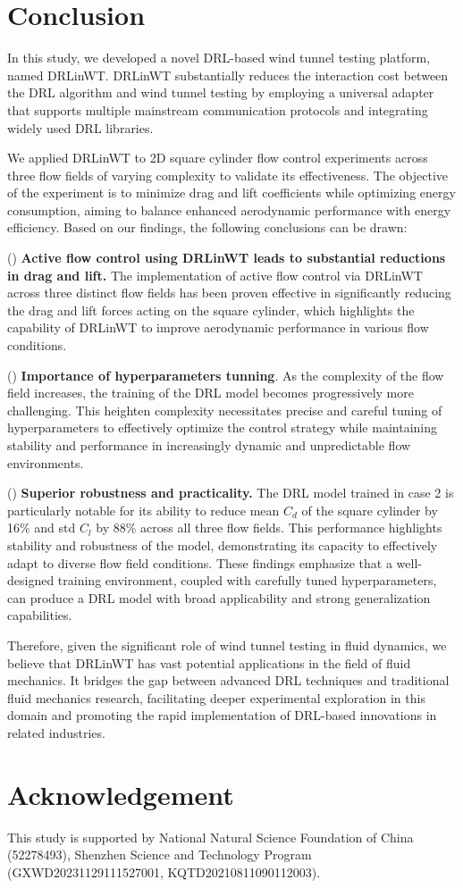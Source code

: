 \documentclass[%
 aip,
 amsmath,amssymb,
 reprint,%
]{revtex4-1}
\begin{document}
\section{Conclusion}

In this study, we developed a novel DRL-based wind tunnel testing platform, named DRLinWT. DRLinWT substantially reduces the interaction cost between the DRL algorithm and wind tunnel testing by employing a universal adapter that supports multiple mainstream communication protocols and integrating widely used DRL libraries.

We applied DRLinWT to 2D square cylinder flow control experiments across three flow fields of varying complexity to validate its effectiveness. The objective of the experiment is to minimize drag and lift coefficients while optimizing energy consumption, aiming to balance enhanced aerodynamic performance with energy efficiency. Based on our findings, the following conclusions can be drawn:

() \textbf{Active flow control using DRLinWT leads to substantial reductions in drag and lift.} The implementation of active flow control via DRLinWT across three distinct flow fields has been proven effective in significantly reducing the drag and lift forces acting on the square cylinder, which highlights the capability of DRLinWT to improve aerodynamic performance in various flow conditions.

() \textbf{Importance of hyperparameters tunning}. As the complexity of the flow field increases, the training of the DRL model becomes progressively more challenging. This heighten complexity necessitates precise and careful tuning of hyperparameters to effectively optimize the control strategy while maintaining stability and performance in increasingly dynamic and unpredictable flow environments.

() \textbf{Superior robustness and practicality.} The DRL model trained in case 2 is particularly notable for its ability to reduce mean $C_d$ of the square cylinder by 16\% and std $C_l$ by 88\% across all three flow fields. This performance highlights stability and robustness of the model, demonstrating its capacity to effectively adapt to diverse flow field conditions. These findings emphasize that a well-designed training environment, coupled with carefully tuned hyperparameters, can produce a DRL model with broad applicability and strong generalization capabilities.

Therefore, given the significant role of wind tunnel testing in fluid dynamics, we believe that DRLinWT has vast potential applications in the field of fluid mechanics. It bridges the gap between advanced DRL techniques and traditional fluid mechanics research, facilitating deeper experimental exploration in this domain and promoting the rapid implementation of DRL-based innovations in related industries.

\section*{Acknowledgement}
This study is supported by National Natural Science Foundation of China (52278493), Shenzhen Science and Technology Program (GXWD20231129111527001, KQTD20210811090112003).


\end{document}
